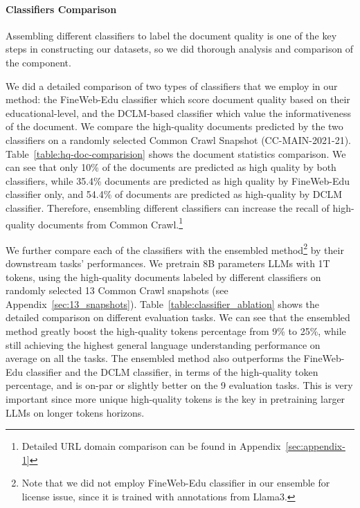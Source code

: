 \documentclass[11pt]{article}
\begin{document}
\paragraph{Classifiers Comparison}
Assembling different classifiers to label the document quality is one of the key steps in constructing our datasets, so we did thorough analysis and comparison of the component.

We did a detailed comparison of two types of classifiers that we employ in our method: the FineWeb-Edu classifier which score document quality based on their educational-level, and the DCLM-based classifier which value the informativeness of the document.  We compare the high-quality documents predicted by the two classifiers on a randomly selected Common Crawl Snapshot (CC-MAIN-2021-21). Table~\ref{table:hq-doc-comparision} shows the document statistics comparison. We can see that only 10\% of the documents are predicted as high quality by both classifiers, while 35.4\% documents are predicted as high quality by FineWeb-Edu classifier only, and 54.4\% of documents are predicted as high-quality by DCLM classifier. Therefore, ensembling different classifiers can increase the recall of  high-quality documents from Common Crawl.\footnote{Detailed URL domain comparison can be found in Appendix~\ref{sec:appendix-1}}

We further compare each of the classifiers with the ensembled method\footnote{Note that we did not employ FineWeb-Edu classifier in our ensemble for license issue, since it is trained with annotations from Llama3.} by their downstream tasks' performances.  We pretrain 8B parameters LLMs with 1T tokens, using the high-quality documents labeled by different classifiers on randomly selected 13 Common Crawl snapshots (see Appendix~\ref{sec:13_snapshots}). Table~\ref{table:classifier_ablation} shows the detailed comparison on different evaluation tasks. We can see that the ensembled method greatly boost the high-quality tokens percentage from 9\% to 25\%, while still achieving the highest general language understanding performance on average on all the tasks. The ensembled method also outperforms the FineWeb-Edu classifier and the DCLM classifier, in terms of the high-quality token percentage, and is on-par or slightly better on the 9 evaluation tasks. This is very important since more unique high-quality tokens is the key in pretraining larger LLMs on longer tokens horizons. 
\end{document}

